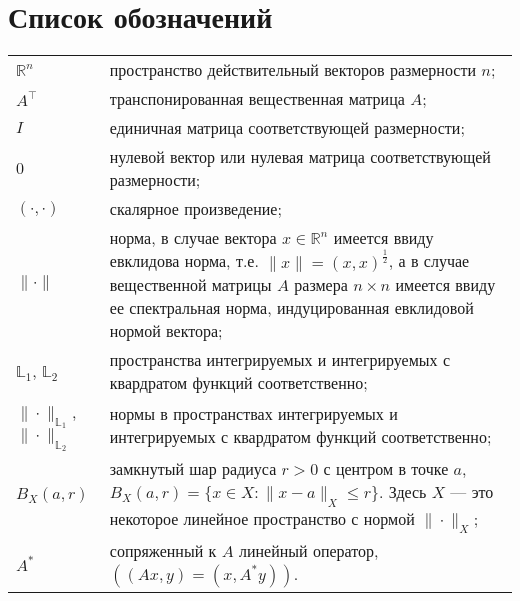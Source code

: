 \documentclass[../main.tex]{subfiles}
\begin{document}
\clearpage
\section*{Список обозначений}
\begin{tabularx}{\textwidth}{lY}
	$\mathbb{R}^n$ & пространство действительный векторов размерности $n$; \\ 
	$A^{\top}$ & транспонированная вещественная матрица $A$; \\ 
	$I$ & единичная матрица соответствующей размерности; \\ 
	$0$ & нулевой вектор или нулевая матрица соответствующей размерности; \\
	$(\cdot,\cdot)$ & скалярное произведение; \\
	$\| \cdot\| $ &  норма, в случае вектора $x \in \mathbb{R}^n$ имеется ввиду евклидова норма,  т.е. $\|x\| = (x,x)^{\frac{1}{2}}$, а в случае вещественной  матрицы $A$ размера $n \times n$ имеется ввиду ее спектральная норма, индуцированная евклидовой нормой вектора; \\
	$\mathbb{L}_1$, $\mathbb{L}_2$ & пространства интегрируемых и интегрируемых с квардратом функций соответственно; \\
	$\|\cdot\|_{\mathbb{L}_1}$, $\|\cdot\|_{\mathbb{L}_2}$ & нормы в пространствах интегрируемых и интегрируемых с квардратом функций соответственно; \\
	$B_X(a,r)$ & замкнутый шар радиуса $r>0$ с центром в точке $a$, $B_X(a, r) = \{x\in X: \|x-a\|_X \leqslant r \}$. Здесь $X$ --- это некоторое линейное пространство с нормой $\|\cdot\|_X$; \\
	$ A^* $ & сопряженный к $A$ линейный оператор, $((Ax, y) = (x, A^*y))$. \\
\end{tabularx}
\end{document}
